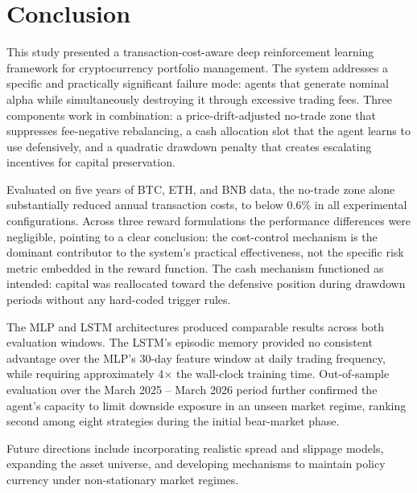 \documentclass[pdflatex,sn-mathphys-num]{sn-jnl}
\begin{document}
\section{Conclusion}\label{sec:conclusion}

This study presented a transaction-cost-aware deep reinforcement learning
framework for cryptocurrency portfolio management. The system addresses a
specific and practically significant failure mode: agents that generate nominal
alpha while simultaneously destroying it through excessive trading fees. Three
components work in combination: a price-drift-adjusted no-trade zone that
suppresses fee-negative rebalancing, a cash allocation slot that the agent
learns to use defensively, and a quadratic drawdown penalty that creates
escalating incentives for capital preservation.

Evaluated on five years of BTC, ETH, and BNB data, the no-trade zone alone
substantially reduced annual transaction costs, to below 0.6\% in all
experimental configurations.
Across three reward formulations the performance differences were negligible,
pointing to a clear conclusion: the cost-control mechanism is the dominant
contributor to the system's practical effectiveness, not the specific risk
metric embedded in the reward function. The cash mechanism functioned as
intended: capital was reallocated toward the defensive position during drawdown
periods without any hard-coded trigger rules.

The MLP and LSTM architectures produced comparable results across both
evaluation windows. The LSTM's episodic memory provided no consistent advantage
over the MLP's 30-day feature window at daily trading frequency, while requiring
approximately 4$\times$ the wall-clock training time. Out-of-sample evaluation
over the March 2025 -- March 2026 period further confirmed the agent's
capacity to limit downside exposure in an unseen market regime, ranking second
among eight strategies during the initial bear-market phase.

Future directions include incorporating realistic spread and slippage models,
expanding the asset universe, and developing mechanisms to maintain policy
currency under non-stationary market regimes.

\backmatter
\end{document}

